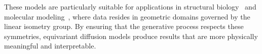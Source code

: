 
These models are particularly suitable for applications in structural biology~ and molecular modeling~, where data resides in geometric domains governed by the linear isometry group. By ensuring that the generative process respects these symmetries, equivariant diffusion models produce results that are more physically meaningful and interpretable.



